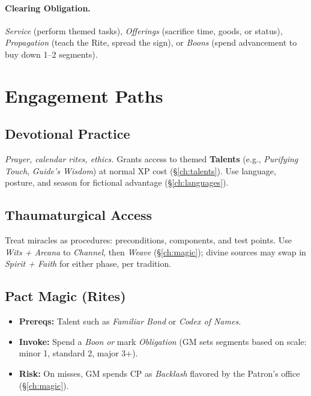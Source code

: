\begin{multicols}{2}
\paragraph{Clearing Obligation.}
\emph{Service} (perform themed tasks), \emph{Offerings} (sacrifice time, goods, or status), \emph{Propagation} (teach the Rite, spread the sign), or \emph{Boons} (spend advancement to buy down 1--2 segments).

\section{Engagement Paths}

\subsection*{Devotional Practice}
\emph{Prayer, calendar rites, ethics.} Grants access to themed \textbf{Talents} (e.g., \emph{Purifying Touch}, \emph{Guide’s Wisdom}) at normal XP cost (\S\ref{ch:talents}). Use language, posture, and season for fictional advantage (\S\ref{ch:languages}).

\subsection*{Thaumaturgical Access}
Treat miracles as procedures: preconditions, components, and test points. Use \emph{Wits + Arcana} to \emph{Channel}, then \emph{Weave} (\S\ref{ch:magic}); divine sources may swap in \emph{Spirit + Faith} for either phase, per tradition.

\subsection*{Pact Magic (Rites)}
\begin{itemize}
  \item \textbf{Prereqs:} Talent such as \emph{Familiar Bond} or \emph{Codex of Names}. 
  \item \textbf{Invoke:} Spend a \emph{Boon} \emph{or} mark \emph{Obligation} (GM sets segments based on scale: minor 1, standard 2, major 3+).
  \item \textbf{Risk:} On misses, GM spends CP as \emph{Backlash} flavored by the Patron’s office (\S\ref{ch:magic}).
\end{itemize}


\end{multicols}
